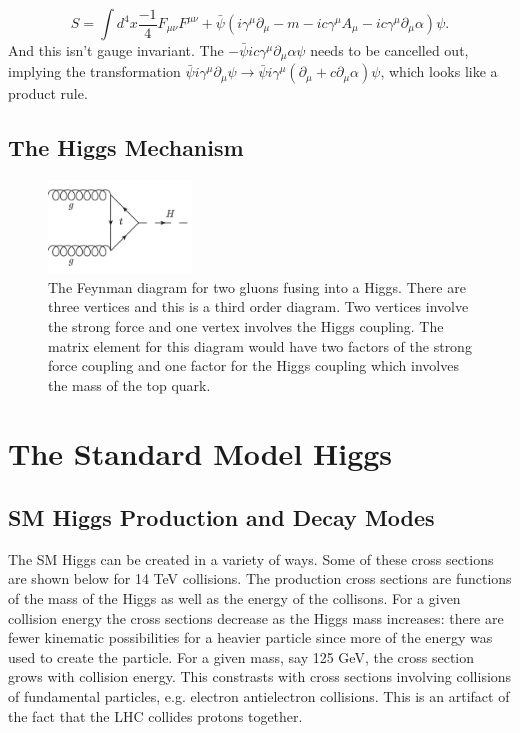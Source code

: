 \begin{equation}
S = \int d^4x \frac{-1}{4}F_{\mu\nu}F^{\mu\nu} + \bar{\psi}\left(i\gamma^\mu\partial_\mu - m - ic\gamma^\mu A_\mu - ic\gamma^\mu\partial_\mu\alpha\right)\psi.
\end{equation}
And this isn't gauge invariant. The $-\bar{\psi}ic\gamma^\mu\partial_\mu\alpha\psi$ needs to be cancelled out, implying the transformation $\bar{\psi}i\gamma^\mu\partial_\mu\psi \rightarrow \bar{\psi}i\gamma^\mu\left(\partial_\mu + c\partial_\mu\alpha\right)\psi$, which looks like a product rule.


\subsection{The Higgs Mechanism}

\begin{figure}[h!]
  \centering
  \includegraphics[width=1.5in]{images/ggf.png}
  \caption
   {The Feynman diagram for two gluons fusing into a Higgs. There are three vertices and this is a third order diagram. Two vertices involve the strong force and one vertex involves the Higgs coupling. The matrix element for this diagram would have two factors of the strong force coupling and one factor for the Higgs coupling which involves the mass of the top quark.}
  \label{fig:feynggf}
\end{figure}

\section{The Standard Model Higgs}


\subsection{SM Higgs Production and Decay Modes}

The SM Higgs can be created in a variety of ways. Some of these cross sections are shown below for 14 TeV collisions. The production cross sections are functions of the mass of the Higgs as well as the energy of the collisons. For a given collision energy the cross sections decrease as the Higgs mass increases: there are fewer kinematic possibilities for a heavier particle since more of the energy was used to create the particle. For a given mass, say 125 GeV, the cross section grows with collision energy. This constrasts with cross sections involving collisions of fundamental particles, e.g. electron antielectron collisions. This is an artifact of the fact that the LHC collides protons together. 

